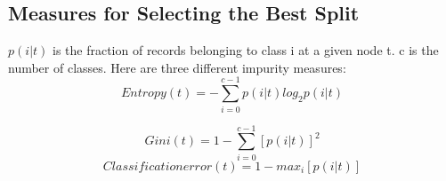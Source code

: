 	\clearpage
	\subsection{Measures for Selecting the Best Split}
		$p(i|t)$ is the fraction of records belonging  to class i at a given node t.		
		c is the number of classes.
		Here are three different impurity measures: 
		\begin{equation}
			Entropy(t) = -\sum_{i=0}^{c-1} p(i|t)log_{2}p(i|t)
		\end{equation}

		\begin{equation}
			Gini(t) = 1 - \sum_{i=0}^{c-1}[p(i|t)]^{2}
		\end{equation}
		\begin{equation}
			Classification error(t) = 1 - max_{i}[p(i|t)]
		\end{equation}

